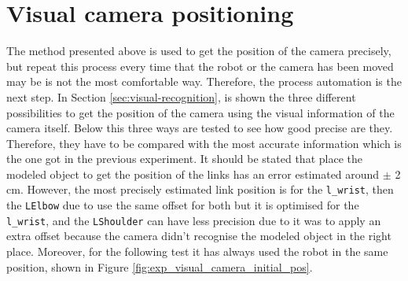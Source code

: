 \documentclass[12pt,a4paper,final,twoside,openright]{report}
\begin{document}
\section{Visual camera positioning}
\label{sec:exp_visual_camera}

The method presented above is used to get the position of the camera precisely, but repeat this process every time that the robot or the camera has been moved may be is not the most comfortable way. Therefore, the process automation is the next step. In Section \ref{sec:visual-recognition}, is shown the three different possibilities to get the position of the camera using the visual information of the camera itself. Below this three ways are tested to see how good precise are they. Therefore, they have to be compared with the most accurate information which is the one got in the previous experiment. It should be stated that place the modeled object to get the position of the links has an error estimated around $\pm$ 2 cm. However, the most precisely estimated link position is for the \texttt{l\_wrist}, then the \texttt{LElbow} due to use the same offset for both but it is optimised for the \texttt{l\_wrist}, and the \texttt{LShoulder} can have less precision due to it was to apply an extra offset because the camera didn't recognise the modeled object in the right place. Moreover, for the following test it has always used the robot in the same position, shown in Figure \ref{fig:exp_visual_camera_initial_pos}.
\end{document}
